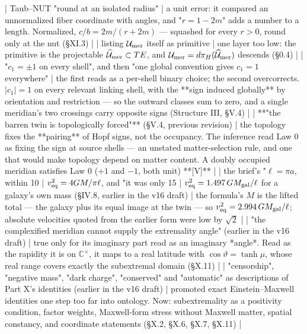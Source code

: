 | Taub–NUT "round at an isolated radius" | a unit error: it compared an unnormalized fiber coordinate with angles, and "$r = 1-2m$" adds a number to a length. Normalized, $c/b = 2m/(r+2m)$ — squashed for every $r>0$, round only at the nut (§XI.3) |
| listing $\mathcal{U}_{\rm mer}$ itself as primitive | one layer too low: the primitive is the projectable $\widehat{\mathcal{U} }_{\rm mer}\subset TE$, and $\mathcal{U}_{\rm mer} = d\pi_H(\widehat{\mathcal{U} }_{\rm mer})$ descends (§0.4) |
| "$c_1 = \pm1$ on every shell", and then "one global convention gives $c_1 = 1$ everywhere" | the first reads as a per-shell binary choice; the second overcorrects. $\lvert c_1\rvert  = 1$ on every relevant linking shell, with the **sign induced globally** by orientation and restriction — so the outward classes sum to zero, and a single meridian's two crossings carry opposite signs (Structure III, §V.4) |
| **"the barren twin is topologically forced"** (§V.4, previous revision) | the topology fixes the **pairing** of Hopf signs, not the occupancy. The inference read Law 0 as fixing the sign at source shells — an unstated matter-selection rule, and one that would make topology depend on matter content. A doubly occupied meridian satisfies Law 0 ($+1$ and $-1$, both unit) **[V]** |
| the brief's "$\ell = \pi a$, within 10%
| $v^2_{\rm eq} = 4GM/\pi\ell$, and "it was only 15%
| $v^2_{\rm eq} = 1.497\,GM_{\rm gal}/\ell$ for a galaxy's own mass (§IV.8, earlier in the v16 draft) | the formula's $M$ is the lifted total — the galaxy plus its equal image at the twin — so $v^2_{\rm eq} = 2.994\,GM_{\rm gal}/\ell$; absolute velocities quoted from the earlier form were low by $\sqrt2$ |
| "the complexified meridian cannot supply the extremality angle" (earlier in the v16 draft) | true only for its imaginary part read as an imaginary *angle*. Read as the rapidity it is on $\mathbb{C}^\times$, it maps to a real latitude with $\cos\vartheta = \tanh\mu$, whose real range covers exactly the subextremal domain (§X.11) |
| "censorship", "negative mass", "dark charge", "conserved" and "automatic" as descriptions of Part X's identities (earlier in the v16 draft) | promoted exact Einstein–Maxwell identities one step too far into ontology. Now: subextremality as a positivity condition, factor weights, Maxwell-form stress without Maxwell matter, spatial constancy, and coordinate statements (§X.2, §X.6, §X.7, §X.11) |
